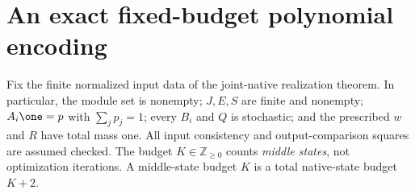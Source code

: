 
\section{An exact fixed-budget polynomial encoding}
\label{sec:budget-encoding}

Fix the finite normalized input data of the joint-native realization theorem.
In particular, the module set is nonempty; $J,E,S$ are finite and nonempty;
$A_i\one=p$ with $\sum_jp_j=1$; every $B_i$ and $Q$ is stochastic;
and the prescribed $w$ and $R$ have total mass one.
All input consistency and output-comparison squares are assumed checked.
The budget $K\in\mathbb Z_{\ge0}$ counts \emph{middle states}, not optimization
iterations. A middle-state budget $K$ is a total native-state budget $K+2$.

